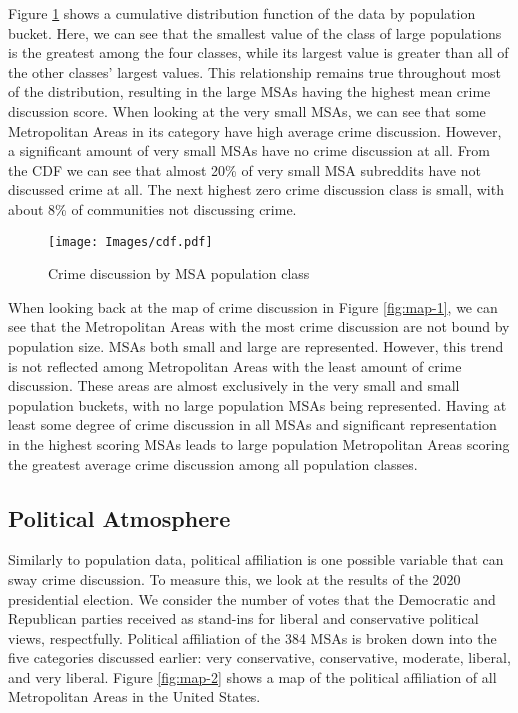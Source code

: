 \documentclass[12pt,oneside, letterpaper]{book}
\begin{document}
\par Figure \ref{fig:cdf-1} shows a cumulative distribution function of the data by population bucket. Here, we can see that the smallest value of the class of large populations is the greatest among the four classes, while its largest value is greater than all of the other classes' largest values. This relationship remains true throughout most of the distribution, resulting in the large MSAs having the highest mean crime discussion score. When looking at the very small MSAs, we can see that some Metropolitan Areas in its category have high average crime discussion. However, a significant amount of very small MSAs have no crime discussion at all. From the CDF we can see that almost 20\% of very small MSA subreddits have not discussed crime at all. The next highest zero crime discussion class is small, with about 8\% of communities not discussing crime.

\begin{figure}[ht]
    \centering
    \texttt{[image: Images/cdf.pdf]}
    \caption{Crime discussion by MSA population class}
    \label{fig:cdf-1}
\end{figure}

\par When looking back at the map of crime discussion in Figure \ref{fig:map-1}, we can see that the Metropolitan Areas with the most crime discussion are not bound by population size. MSAs both small and large are represented. However, this trend is not reflected among Metropolitan Areas with the least amount of crime discussion. These areas are almost exclusively in the very small and small population buckets, with no large population MSAs being represented. Having at least some degree of crime discussion in all MSAs and significant representation in the highest scoring MSAs leads to large population Metropolitan Areas scoring the greatest average crime discussion among all population classes.

\subsection{Political Atmosphere}

\par Similarly to population data, political affiliation is one possible variable that can sway crime discussion. To measure this, we look at the results of the 2020 presidential election. We consider the number of votes that the Democratic and Republican parties received as stand-ins for liberal and conservative political views, respectfully. Political affiliation of the 384 MSAs is broken down into the five categories discussed earlier: very conservative, conservative, moderate, liberal, and very liberal. Figure \ref{fig:map-2} shows a map of the political affiliation of all Metropolitan Areas in the United States.
\end{document}

